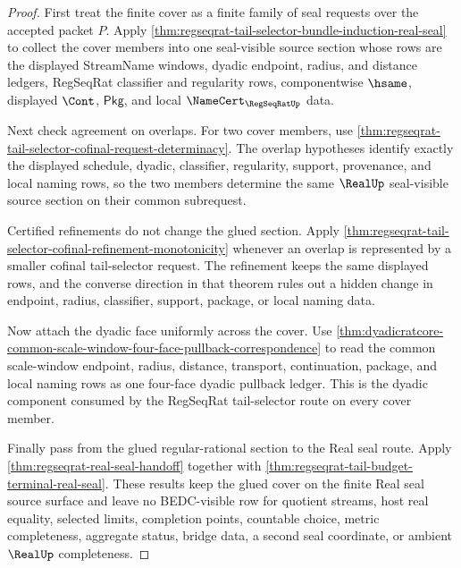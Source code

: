 \begin{proof}
First treat the finite cover as a finite family of seal requests over the
accepted packet $P$. Apply
\autoref{thm:regseqrat-tail-selector-bundle-induction-real-seal} to collect
the cover members into one seal-visible source section whose rows are the
displayed StreamName windows, dyadic endpoint, radius, and distance ledgers,
RegSeqRat classifier and regularity rows, componentwise $\hsame$, displayed
$\Cont$, $\mathsf{Pkg}$, and local $\NameCert_{\RegSeqRatUp}$ data.

Next check agreement on overlaps. For two cover members, use
\autoref{thm:regseqrat-tail-selector-cofinal-request-determinacy}. The overlap
hypotheses identify exactly the displayed schedule, dyadic, classifier,
regularity, support, provenance, and local naming rows, so the two members
determine the same $\RealUp$ seal-visible source section on their common
subrequest.

Certified refinements do not change the glued section. Apply
\autoref{thm:regseqrat-tail-selector-cofinal-refinement-monotonicity} whenever
an overlap is represented by a smaller cofinal tail-selector request. The
refinement keeps the same displayed rows, and the converse direction in that
theorem rules out a hidden change in endpoint, radius, classifier, support,
package, or local naming data.

Now attach the dyadic face uniformly across the cover. Use
\autoref{thm:dyadicratcore-common-scale-window-four-face-pullback-correspondence}
to read the common scale-window endpoint, radius, distance, transport,
continuation, package, and local naming rows as one four-face dyadic pullback
ledger. This is the dyadic component consumed by the RegSeqRat tail-selector
route on every cover member.

Finally pass from the glued regular-rational section to the Real seal route.
Apply \autoref{thm:regseqrat-real-seal-handoff} together with
\autoref{thm:regseqrat-tail-budget-terminal-real-seal}. These results keep the
glued cover on the finite Real seal source surface and leave no BEDC-visible
row for quotient streams, host real equality, selected limits, completion
points, countable choice, metric completeness, aggregate status, bridge data,
a second seal coordinate, or ambient $\RealUp$ completeness.
\end{proof}

